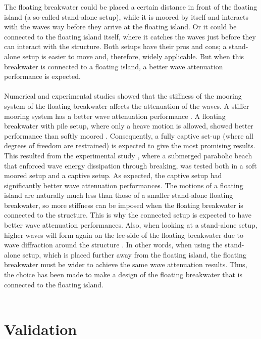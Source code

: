 The floating breakwater could be placed a certain distance in front of the floating island (a so-called stand-alone setup), while it is moored by itself and interacts with the waves way before they arrive at the floating island. Or it could be connected to the floating island itself, where it catches the waves just before they can interact with the structure. Both setups have their pros and cons; a stand-alone setup is easier to move and, therefore, widely applicable. But when this breakwater is connected to a floating island, a better wave attenuation performance is expected.\\
\\
Numerical and experimental studies showed that the stiffness of the mooring system of the floating breakwater affects the attenuation of the waves. A stiffer mooring system has a better wave attenuation performance \citep{Loukogeorgaki2006} \citep{Loukogeorgaki2017}. A floating breakwater with pile setup, where only a heave motion is allowed, showed better performance than softly moored \citep{Ruol2012}. Consequently, a fully captive set-up (where all degrees of freedom are restrained) is expected to give the most promising results. This resulted from the experimental study \citep{Zanden2021}, where a submerged parabolic beach that enforced wave energy dissipation through breaking, was tested both in a soft moored setup and a captive setup. As expected, the captive setup had significantly better wave attenuation performances. The motions of a floating island are naturally much less than those of a smaller stand-alone floating breakwater, so more stiffness can be imposed when the floating breakwater is connected to the structure. This is why the connected setup is expected to have better wave attenuation performances. 
Also, when looking at a stand-alone setup, higher waves will form again on the lee-side of the floating breakwater due to wave diffraction around the structure \citep{Holthuijsen2007} \citep{Zanden2021}. In other words, when using the stand-alone setup, which is placed further away from the floating island, the floating breakwater must be wider to achieve the same wave attenuation results. Thus, the choice has been made to make a design of the floating breakwater that is connected to the floating island. \\
\\


\section{Validation}
\label{sec: methodology validation}


